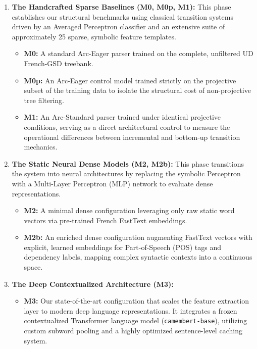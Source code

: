 \documentclass[12pt,a4paper]{article}
\begin{document}
\begin{enumerate}
    \item \textbf{The Handcrafted Sparse Baselines (M0, M0p, M1):} This phase establishes our structural benchmarks using classical transition systems driven by an Averaged Perceptron classifier and an extensive suite of approximately 25 sparse, symbolic feature templates.
    \begin{itemize}
        \item \textbf{M0:} A standard Arc-Eager parser trained on the complete, unfiltered UD French-GSD treebank.
        \item \textbf{M0p:} An Arc-Eager control model trained strictly on the projective subset of the training data to isolate the structural cost of non-projective tree filtering.
        \item \textbf{M1:} An Arc-Standard parser trained under identical projective conditions, serving as a direct architectural control to measure the operational differences between incremental and bottom-up transition mechanics.
    \end{itemize}
    
    \item \textbf{The Static Neural Dense Models (M2, M2b):} This phase transitions the system into neural architectures by replacing the symbolic Perceptron with a Multi-Layer Perceptron (MLP) network to evaluate dense representations.
    \begin{itemize}
        \item \textbf{M2:} A minimal dense configuration leveraging only raw static word vectors via pre-trained French FastText embeddings.
        \item \textbf{M2b:} An enriched dense configuration augmenting FastText vectors with explicit, learned embeddings for Part-of-Speech (POS) tags and dependency labels, mapping complex syntactic contexts into a continuous space.
    \end{itemize}
    
    \item \textbf{The Deep Contextualized Architecture (M3):} 
    \begin{itemize}
        \item \textbf{M3:} Our state-of-the-art configuration that scales the feature extraction layer to modern deep language representations. It integrates a frozen contextualized Transformer language model (\texttt{camembert-base}), utilizing custom subword pooling and a highly optimized sentence-level caching system.
    \end{itemize}
\end{enumerate}
\end{document}

